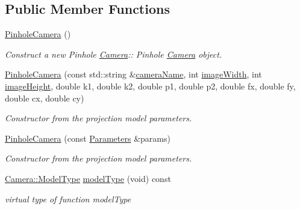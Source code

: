 \subsection*{Public Member Functions}
\begin{DoxyCompactItemize}
\item 
\mbox{\label{classcamodocal_1_1PinholeCamera_a28240fc319cf7202d41fc7d4438e0644}} 
\hyperlink{classcamodocal_1_1PinholeCamera_a28240fc319cf7202d41fc7d4438e0644}{Pinhole\+Camera} ()
\begin{DoxyCompactList}\small\item\em Construct a new Pinhole \hyperlink{classcamodocal_1_1Camera}{Camera}\+:\+: Pinhole \hyperlink{classcamodocal_1_1Camera}{Camera} object. \end{DoxyCompactList}\item 
\hyperlink{classcamodocal_1_1PinholeCamera_a0c9a5b62bd0e40adfa76585ab1fa3e9e}{Pinhole\+Camera} (const std\+::string \&\hyperlink{classcamodocal_1_1PinholeCamera_a7ae231baab11bf3d6567333e524743ac}{camera\+Name}, int \hyperlink{classcamodocal_1_1PinholeCamera_ae7db15be608e87b2445ed9fff6c0d9f7}{image\+Width}, int \hyperlink{classcamodocal_1_1PinholeCamera_a4a4df33440bc1c8b013523b8b289ac2d}{image\+Height}, double k1, double k2, double p1, double p2, double fx, double fy, double cx, double cy)
\begin{DoxyCompactList}\small\item\em Constructor from the projection model parameters. \end{DoxyCompactList}\item 
\hyperlink{classcamodocal_1_1PinholeCamera_ac4f4bd1a6899d44fef60e645ba09eabb}{Pinhole\+Camera} (const \hyperlink{classcamodocal_1_1PinholeCamera_1_1Parameters}{Parameters} \&params)
\begin{DoxyCompactList}\small\item\em Constructor from the projection model parameters. \end{DoxyCompactList}\item 
\mbox{\label{classcamodocal_1_1PinholeCamera_aa740972c7a7bcd335f2c02d2558dbf3d}} 
\hyperlink{classcamodocal_1_1Camera_a663bb19b7b1f38f6d1b7eeb0890183ff}{Camera\+::\+Model\+Type} \hyperlink{classcamodocal_1_1PinholeCamera_aa740972c7a7bcd335f2c02d2558dbf3d}{model\+Type} (void) const
\begin{DoxyCompactList}\small\item\em virtual type of function model\+Type \end{DoxyCompactList}\item 

\end{DoxyCompactItemize}
